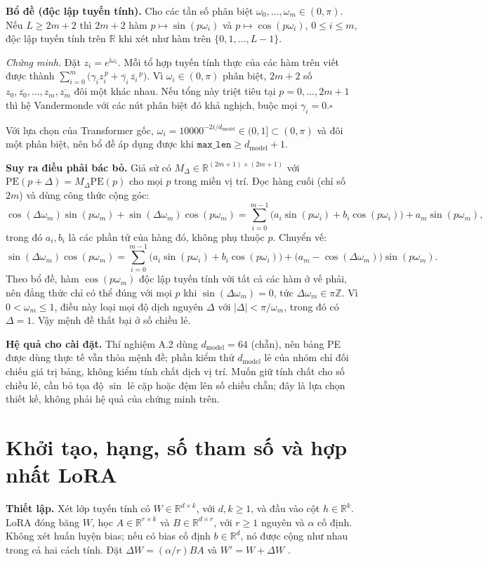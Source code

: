 \documentclass[11pt,a4paper]{article}
\newcommand{\R}{\mathbb{R}}
\newcommand{\PE}{\mathrm{PE}}
\begin{document}
\textbf{Bổ đề (độc lập tuyến tính).} Cho các tần số phân biệt $\omega_0,\ldots,\omega_m\in(0,\pi)$. Nếu $L\ge 2m+2$ thì $2m+2$ hàm $p\mapsto\sin(p\omega_i)$ và $p\mapsto\cos(p\omega_i)$, $0\le i\le m$, độc lập tuyến tính trên $\R$ khi xét như hàm trên $\{0,1,\ldots,L-1\}$.

\emph{Chứng minh.} Đặt $z_i=e^{\mathrm i\omega_i}$. Mỗi tổ hợp tuyến tính thực của các hàm trên viết được thành $\sum_{i=0}^{m}\bigl(\gamma_i z_i^{\,p}+\overline{\gamma_i}\,\overline{z_i}^{\,p}\bigr)$. Vì $\omega_i\in(0,\pi)$ phân biệt, $2m+2$ số $z_0,\overline{z_0},\ldots,z_m,\overline{z_m}$ đôi một khác nhau. Nếu tổng này triệt tiêu tại $p=0,\ldots,2m+1$ thì hệ Vandermonde với các nút phân biệt đó khả nghịch, buộc mọi $\gamma_i=0$.\hfill$\square$

Với lựa chọn của Transformer gốc, $\omega_i=10000^{-2i/d_{\mathrm{model}}}\in(0,1]\subset(0,\pi)$ và đôi một phân biệt, nên bổ đề áp dụng được khi $\texttt{max\_len}\ge d_{\mathrm{model}}+1$.

\textbf{Suy ra điều phải bác bỏ.} Giả sử có $M_\Delta\in\R^{(2m+1)\times(2m+1)}$ với $\PE(p+\Delta)=M_\Delta\PE(p)$ cho mọi $p$ trong miền vị trí. Đọc hàng cuối (chỉ số $2m$) và dùng công thức cộng góc:
\[
  \cos(\Delta\omega_m)\sin(p\omega_m)+\sin(\Delta\omega_m)\cos(p\omega_m)
  =\sum_{i=0}^{m-1}\bigl(a_i\sin(p\omega_i)+b_i\cos(p\omega_i)\bigr)
   +a_m\sin(p\omega_m),
\]
trong đó $a_i,b_i$ là các phần tử của hàng đó, không phụ thuộc $p$. Chuyển vế:
\[
  \sin(\Delta\omega_m)\cos(p\omega_m)
  =\sum_{i=0}^{m-1}\bigl(a_i\sin(p\omega_i)+b_i\cos(p\omega_i)\bigr)
   +\bigl(a_m-\cos(\Delta\omega_m)\bigr)\sin(p\omega_m).
\]
Theo bổ đề, hàm $\cos(p\omega_m)$ độc lập tuyến tính với tất cả các hàm ở vế phải, nên đẳng thức chỉ có thể đúng với mọi $p$ khi $\sin(\Delta\omega_m)=0$, tức $\Delta\omega_m\in\pi\mathbb Z$. Vì $0<\omega_m\le 1$, điều này loại mọi độ dịch nguyên $\Delta$ với $|\Delta|<\pi/\omega_m$, trong đó có $\Delta=1$. Vậy mệnh đề thất bại ở số chiều lẻ.

\textbf{Hệ quả cho cài đặt.} Thí nghiệm A.2 dùng $d_{\mathrm{model}}=64$ (chẵn), nên bảng PE được dùng thực tế vẫn thỏa mệnh đề; phần kiểm thử $d_{\mathrm{model}}$ lẻ của nhóm chỉ đối chiếu giá trị bảng, không kiểm tính chất dịch vị trí. Muốn giữ tính chất cho số chiều lẻ, cần bỏ tọa độ $\sin$ lẻ cặp hoặc đệm lên số chiều chẵn; đây là lựa chọn thiết kế, không phải hệ quả của chứng minh trên.

\section{Khởi tạo, hạng, số tham số và hợp nhất LoRA}
\label{sec:lora}
\textbf{Thiết lập.} Xét lớp tuyến tính có $W\in\R^{d\times k}$, với $d,k\ge1$, và đầu vào cột $h\in\R^k$. LoRA đóng băng $W$, học $A\in\R^{r\times k}$ và $B\in\R^{d\times r}$, với $r\ge1$ nguyên và $\alpha$ cố định. Không xét huấn luyện bias; nếu có bias cố định $b\in\R^d$, nó được cộng như nhau trong cả hai cách tính. Đặt $\Delta W=(\alpha/r)BA$ và $W'=W+\Delta W$ \cite[§4.1–4.2]{lora}.
\end{document}
